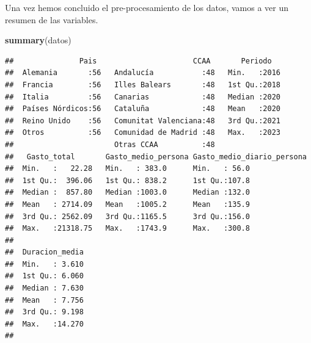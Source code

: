 \documentclass[data,article,submit,moreauthors,pdftex]{Definitions/mdpi}
\newenvironment{Shaded}{\begin{snugshade}}{\end{snugshade}}
\newcommand{\FunctionTok}[1]{\textcolor[rgb]{0.13,0.29,0.53}{\textbf{#1}}}
\newcommand{\NormalTok}[1]{#1}
\begin{document}
Una vez hemos concluido el pre-procesamiento de los datos, vamos a ver
un resumen de las variables.

\begin{Shaded}
\begin{Highlighting}[]
\FunctionTok{summary}\NormalTok{(datos)}
\end{Highlighting}
\end{Shaded}

\begin{verbatim}
##               Pais                      CCAA       Periodo    
##  Alemania       :56   Andalucía           :48   Min.   :2016  
##  Francia        :56   Illes Balears       :48   1st Qu.:2018  
##  Italia         :56   Canarias            :48   Median :2020  
##  Países Nórdicos:56   Cataluña            :48   Mean   :2020  
##  Reino Unido    :56   Comunitat Valenciana:48   3rd Qu.:2021  
##  Otros          :56   Comunidad de Madrid :48   Max.   :2023  
##                       Otras CCAA          :48                 
##   Gasto_total       Gasto_medio_persona Gasto_medio_diario_persona
##  Min.   :   22.28   Min.   : 383.0      Min.   : 56.0             
##  1st Qu.:  396.06   1st Qu.: 838.2      1st Qu.:107.8             
##  Median :  857.80   Median :1003.0      Median :132.0             
##  Mean   : 2714.09   Mean   :1005.2      Mean   :135.9             
##  3rd Qu.: 2562.09   3rd Qu.:1165.5      3rd Qu.:156.0             
##  Max.   :21318.75   Max.   :1743.9      Max.   :300.8             
##                                                                   
##  Duracion_media  
##  Min.   : 3.610  
##  1st Qu.: 6.060  
##  Median : 7.630  
##  Mean   : 7.756  
##  3rd Qu.: 9.198  
##  Max.   :14.270  
## 
\end{verbatim}
\end{document}
